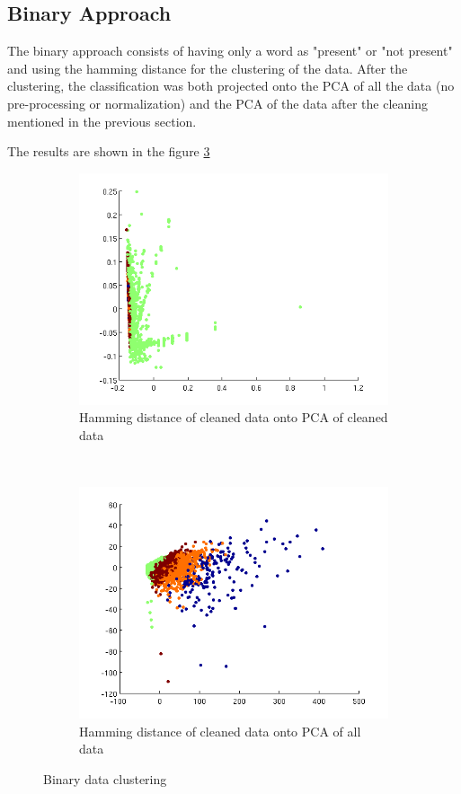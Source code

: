 \documentclass[a4paper,10pt]{article}
\begin{document}
\subsection{Binary Approach}
The binary approach consists of having only a word as "present" or "not present" and using the hamming distance for the clustering of the data. After the clustering, the classification was both projected onto the PCA of all the data (no pre-processing or normalization) and the PCA of the data after the cleaning mentioned in the previous section.

The results are shown in the figure \ref{fig:binary}
\begin{figure}[h!]
\centering
\begin{subfigure}[b]{0.4\textwidth}
\includegraphics[width=\textwidth]{Images/hamming.png}
\caption{Hamming distance of cleaned data onto PCA of cleaned data}
\label{fig:binary1}
\end{subfigure}
~
\begin{subfigure}[b]{0.4\textwidth}
\includegraphics[width=\textwidth]{Images/HammingDistanceOriginal.png}
\caption{Hamming distance of cleaned data onto PCA of all data}
\label{fig:binary2}
\end{subfigure}
\caption{Binary data clustering}
\label{fig:binary}
\end{figure}
\end{document}
